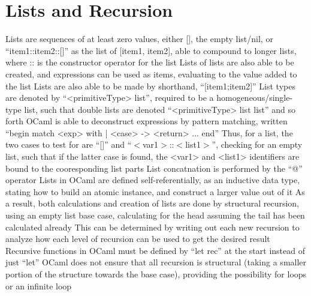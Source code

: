 \documentclass[11 pt, twoside]{article}
\newenvironment{outline*}
{
	\begin{outline}[enumerate]
	}
	{\end{outline}
}
\begin{document}
\section{Lists and Recursion}
\begin{outline*}
\1 Lists are sequences of at least zero values, either [], the empty list/nil, or ``item1::item2::[]'' as the list of [item1, item2], able to compound to longer lists, where :: is the constructor operator for the list
\2 Lists of lists are also able to be created, and expressions can be used as items, evaluating to the value added to the list
\2 Lists are also able to be made by shorthand, ``[item1;item2]''
\2 List types are denoted by ``<primitiveType> list'', required to be a homogeneous/single-type list, such that double lists are denoted ``<primitiveType> list list'' and so forth
\2 OCaml is able to deconstruct expressions by pattern matching, written ``begin match <exp> with | <case> -> <return> ... end''
\3 Thus, for a list, the two cases to test for are ``[]'' and ``$<$var1$>$::$<$list1$>$'', checking for an empty list, such that if the latter case is found, the <var1> and <list1> identifiers are bound to the cooresponding list parts
\2 List concatnation is performed by the ``@'' operator
\1 Lists in OCaml are defined self-referentially, as an inductive data type, stating how to build an atomic instance, and construct a larger value out of it
\2 As a result, both calculations and creation of lists are done by structural recursion, using an empty list base case, calculating for the head assuming the tail has been calculated already
\3 This can be determined by writing out each new recursion to analyze how each level of recursion can be used to get the desired result
\2 Recursive functions in OCaml must be defined by ``let rec'' at the start instead of just ``let''
\2 OCaml does not ensure that all recursion is structural (taking a smaller portion of the structure towards the base case), providing the possibility for loops or an infinite loop
\end{outline*}
\end{document}
